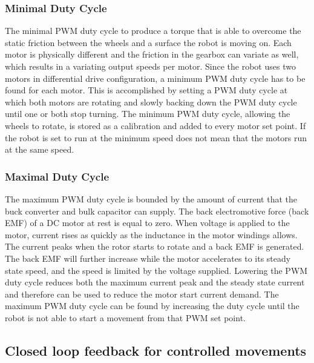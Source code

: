 \subsubsection{Minimal Duty Cycle}

The minimal PWM duty cycle to produce a torque that is able to overcome the static friction between the wheels and a surface the robot is moving on.
Each motor is physically different and the friction in the gearbox can variate as well, which results in a variating output speeds per motor.
Since the robot uses two motors in differential drive configuration, a minimum PWM duty cycle has to be found for each motor.
This is accomplished by setting a PWM duty cycle at which both motors are rotating and slowly backing down the PWM duty cycle until one or both stop turning.
The minimum PWM duty cycle, allowing the wheels to rotate, is stored as a calibration and added to every motor set point.
If the robot is set to run at the minimum speed does not mean that the motors run at the same speed.

\subsubsection{Maximal Duty Cycle}

The maximum PWM duty cycle is bounded by the amount of current that the buck converter and bulk capacitor can supply.
The back electromotive force (back EMF) of a DC motor at rest is equal to zero.
When voltage is applied to the motor, current rises as quickly as the inductance in the motor windings allows. 
The current peaks when the rotor starts to rotate and a back EMF is generated.
The back EMF will further increase while the motor accelerates to its steady state speed, and the speed is limited by the voltage supplied.
Lowering the PWM duty cycle reduces both the maximum current peak and the steady state current and therefore can be used to reduce the motor start current demand.
The maximum PWM duty cycle can be found by increasing the duty cycle until the robot is not able to start a movement from that PWM set point.


\subsection{Closed loop feedback for controlled movements}

